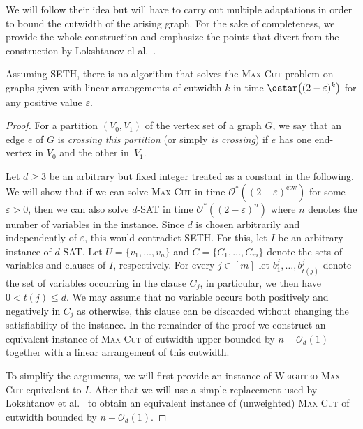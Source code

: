 \documentclass[a4paper,UKenglish,cleveref, autoref, thm-restate]{lipics-v2021}
\begin{document}
We will follow their idea but will have to carry out multiple adaptations in order to bound the cutwidth of the arising graph.
For the sake of completeness, we provide the whole construction and emphasize the points that divert from the construction by Lokshtanov el al.~\cite{DBLP:journals/talg/LokshtanovMS18}. 	

\begin{theorem}
    Assuming SETH, there is no algorithm that solves the {\textsc{Max Cut}} problem on graphs given with linear arrangements of cutwidth $k$ in time $\ostar\big((2-\varepsilon)^{k}\big)$ for any positive value $\varepsilon$.
\end{theorem}

\begin{proof}
    For a partition $(V_0, V_1)$ of the vertex set of a graph $G$, we say that an edge $e$ of $G$ is \emph{crossing this partition} (or simply \emph{is crossing}) if $e$ has one end-vertex in $V_0$ and the other in~$V_1$.
    
    Let $d \geq 3$ be an arbitrary but fixed integer treated as a constant in the following.
    We will show that if we can solve \textsc{Max Cut} in time $\mathcal{O}^*((2-\varepsilon)^{\operatorname{ctw}})$ for some $\varepsilon > 0$, then we can also solve $d$-\textsc{SAT} in time $\mathcal{O}^*((2-\varepsilon)^n)$ where $n$ denotes the number of variables in the instance.
    Since $d$ is chosen arbitrarily and independently of $\varepsilon$, this would contradict SETH.
    For this, let $I$ be an arbitrary instance of $d$-\textsc{SAT}.
    Let $U = \{v_1, \dots, v_n\}$ and $C = \{C_1, \dots, C_m\}$ denote the sets of variables and clauses of $I$, respectively.
    For every $j \in [m]$ let $b^j_1, \dots, b^j_{t(j)}$ denote the set of variables occurring in the clause $C_j$, in particular, we then have $0 < t(j) \leq d$.
    We may assume that no variable occurs both positively and negatively in $C_j$ as otherwise, this clause can be discarded without changing the satisfiability of the instance.
    In the remainder of the proof we construct an equivalent instance of \textsc{Max Cut} of cutwidth upper-bounded by $n + \mathcal{O}_d(1)$ together with a linear arrangement of this cutwidth.

    To simplify the arguments, we will first provide an instance of \textsc{Weighted Max Cut} equivalent to $I$. After that we will use a simple replacement used by Lokshtanov et al.~\cite{DBLP:journals/talg/LokshtanovMS18} to obtain an equivalent instance of (unweighted) \textsc{Max Cut} of cutwidth bounded by $n + \mathcal{O}_d(1)$. 
    

\end{proof}
\end{document}
